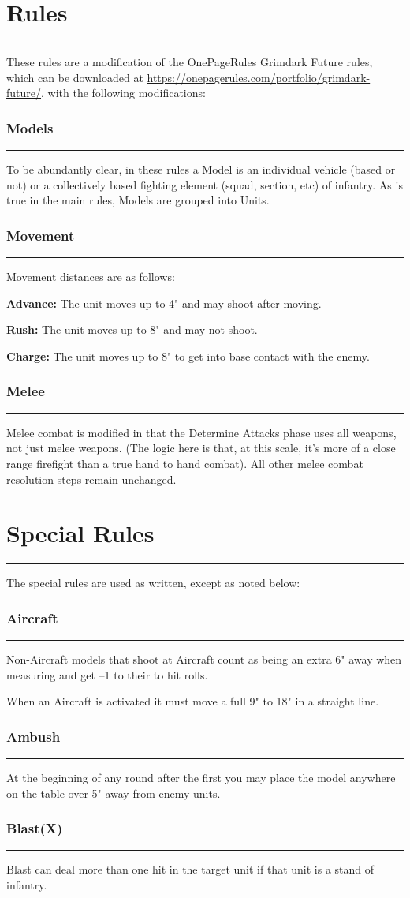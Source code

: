\documentclass[11pt]{article}
\newcommand{\mysection}[1]{
  \section*{\centering #1}
  \raggedright
  \hrule
  \bigskip

}
\newcommand{\myheading}[1]{
  \subsubsection*{\centering #1}
  \raggedright
  \hrule
}
\renewenvironment{description}
  {\list{}{\labelwidth=0pt \leftmargin=0pt
   \let\makelabel\descriptionlabel}}
  {\endlist}
\newenvironment{mydescription}{
\begin{description}
  \setlength{\itemsep}{1pt}
  \setlength{\parskip}{0pt}
  \setlength{\parsep}{0pt}}{\end{description}
}
\begin{document}
\begin{multicols*}{3}[]
\mysection{Rules}

These rules are a modification of the OnePageRules Grimdark Future rules, which
can be downloaded at \url{https://onepagerules.com/portfolio/grimdark-future/},
with the following modifications:

\myheading{Models}

To be abundantly clear, in these rules a Model is an individual vehicle (based
or not) or a collectively based fighting element (squad, section, etc) of
infantry. As is true in the main rules, Models are grouped into Units.

\myheading{Movement}

Movement distances are as follows:

\begin{mydescription}

\item{\bf Advance:} The unit moves up to 4" and may shoot after moving.
\item{\bf Rush:} The unit moves up to 8" and may not shoot.
\item{\bf Charge:} The unit moves up to 8" to get into base contact with the
enemy.

\end{mydescription}

\myheading{Melee}

Melee combat is modified in that the Determine Attacks phase uses all weapons,
not just melee weapons. (The logic here is that, at this scale, it's more of a
close range firefight than a true hand to hand combat). All other melee combat
resolution steps remain unchanged.

\mysection{Special Rules}

The special rules are used as written, except as noted below:

\myheading{Aircraft}

Non-Aircraft models that shoot at Aircraft count as being an extra 6" away when
measuring and get –1 to their to hit rolls.

\smallskip

When an Aircraft is activated it must move a full 9" to 18" in a straight line.

\myheading{Ambush}

At the beginning of any round after the first you may place the model anywhere
on the table over 5" away from enemy units.

\myheading{Blast(X)}

Blast can deal more than one hit in the target unit if that unit is a stand of infantry.


\end{multicols*}
\end{document}
